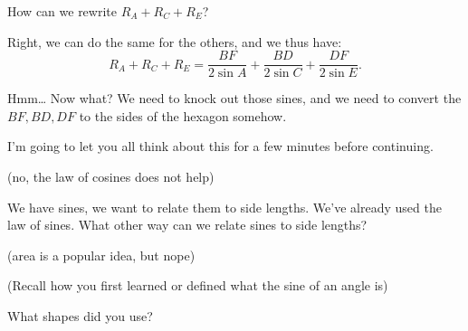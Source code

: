 How can we rewrite $R_A + R_C + R_E $?






Right, we can do the same for the others, and we thus have: $$R_A + R_C + R_E = \frac{BF}{2\sin A} + \frac{BD}{2 \sin C} + \frac{DF}{2 \sin E}.$$

Hmm…  Now what?  We need to knock out those sines, and we need to convert the $BF, BD, DF$ to the sides of the hexagon somehow.

I'm going to let you all think about this for a few minutes before continuing.

(no, the law of cosines does not help)

We have sines, we want to relate them to side lengths.  We've already used the law of sines.  What other way can we relate sines to side lengths?

(area is a popular idea, but nope)

(Recall how you first learned or defined what the sine of an angle is)

What shapes did you use?




